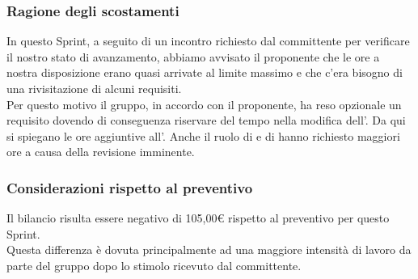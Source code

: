 \subsubsection{Ragione degli scostamenti} \label{subsubsection:ragione_scostamenti_sprint6}
In questo Sprint\glo{}, a seguito di un incontro richiesto dal committente per verificare il nostro stato di avanzamento, abbiamo avvisato il proponente che le ore a nostra disposizione erano quasi arrivate al limite massimo e che c'era bisogno di una rivisitazione di alcuni requisiti.
\\Per questo motivo il gruppo, in accordo con il proponente, ha reso opzionale un requisito dovendo di conseguenza riservare del tempo nella modifica dell'\docNameVersionAdR{}. Da qui si spiegano le ore aggiuntive all'\roleAnalystLow{}.
Anche il ruolo di \roleDesignerLow{} e di \roleVerifierLow{} hanno richiesto maggiori ore a causa della revisione imminente.

\subsubsection{Considerazioni rispetto al preventivo} \label{subsubsection:considerazioni_finali_sprint6}
Il bilancio risulta essere negativo di 105,00€ rispetto al preventivo per questo Sprint\glo{}.
\\Questa differenza è dovuta principalmente ad una maggiore intensità di lavoro da parte del gruppo dopo lo stimolo ricevuto dal committente.


